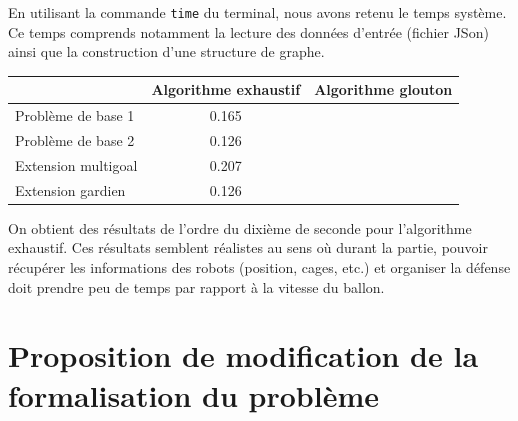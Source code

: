 \documentclass[12pt]{article}
\begin{document}
En utilisant la commande \texttt{time} du terminal, nous avons retenu le temps système. Ce temps comprends notamment la lecture des données d'entrée (fichier JSon) ainsi que la construction d'une structure de graphe.

\begin{center}
  \begin{tabular}{|l|c|c|}
    \hline
    & Algorithme exhaustif & Algorithme glouton \\
    \hline
    Problème de base 1 & 0.165 & \\
    \hline
    Problème de base 2 & 0.126 & \\
    \hline
    Extension multigoal & 0.207 & \\
    \hline
    Extension gardien & 0.126 & \\
    \hline
  \end{tabular}
\end{center}

On obtient des résultats de l'ordre du dixième de seconde pour l'algorithme exhaustif. Ces résultats semblent réalistes au sens où durant la partie, pouvoir récupérer les informations des robots (position, cages, etc.) et organiser la défense doit prendre peu de temps par rapport à la vitesse du ballon.

\section{Proposition de modification de la formalisation du problème}
\end{document}
